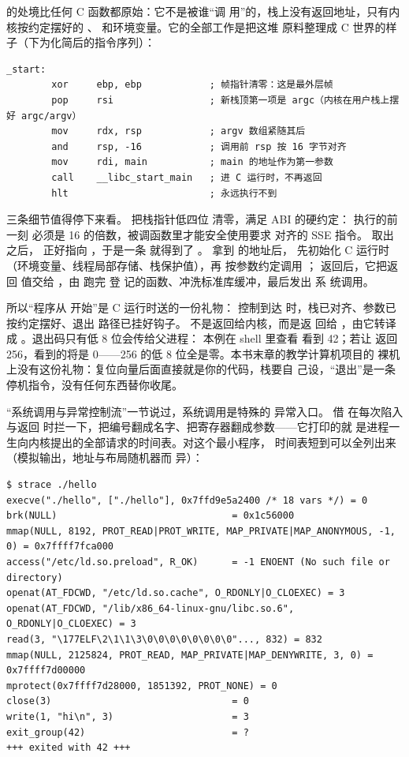  的处境比任何 C 函数都原始：它不是被谁“调
用”的，栈上没有返回地址，只有内核按约定摆好的
、 和环境变量。它的全部工作是把这堆
原料整理成 C 世界的样子（下为化简后的指令序列）：

\begin{lstlisting}
_start:
        xor     ebp, ebp            ; 帧指针清零：这是最外层帧
        pop     rsi                 ; 新栈顶第一项是 argc（内核在用户栈上摆好 argc/argv）
        mov     rdx, rsp            ; argv 数组紧随其后
        and     rsp, -16            ; 调用前 rsp 按 16 字节对齐
        mov     rdi, main           ; main 的地址作为第一参数
        call    __libc_start_main   ; 进 C 运行时，不再返回
        hlt                         ; 永远执行不到
\end{lstlisting}

三条细节值得停下来看。 把栈指针低四位
清零，满足 ABI 的硬约定： 执行的前一刻
 必须是 16 的倍数，被调函数里才能安全使用要求
对齐的 SSE 指令。 取出  之后，
 正好指向 ，于是一条
 就得到了 。
 拿到  的地址后，
先初始化 C 运行时（环境变量、线程局部存储、栈保护值），再
按参数约定调用 ； 返回后，它把返回
值交给 ，由  跑完  登
记的函数、冲洗标准库缓冲，最后发出  系
统调用。

所以“程序从  开始”是 C 运行时送的一份礼物：
控制到达  时，栈已对齐、参数已按约定摆好、退出
路径已挂好钩子。 不是返回给内核，而是返
回给 ，由它转译成
。退出码只有低 8 位会传给父进程：
本例在 shell 里查看  看到 42；若让 
返回 256，看到的将是 0——256 的低 8 位全是零。本书末章的教学计算机项目的
裸机上没有这份礼物：复位向量后面直接就是你的代码，栈要自
己设，“退出”是一条停机指令，没有任何东西替你收尾。

“系统调用与异常控制流”一节说过，系统调用是特殊的
异常入口。 借  在每次陷入与返回
时拦一下，把编号翻成名字、把寄存器翻成参数——它打印的就
是进程一生向内核提出的全部请求的时间表。对这个最小程序，
时间表短到可以全列出来（模拟输出，地址与布局随机器而
异）：

\begin{lstlisting}
$ strace ./hello
execve("./hello", ["./hello"], 0x7ffd9e5a2400 /* 18 vars */) = 0
brk(NULL)                               = 0x1c56000
mmap(NULL, 8192, PROT_READ|PROT_WRITE, MAP_PRIVATE|MAP_ANONYMOUS, -1, 0) = 0x7ffff7fca000
access("/etc/ld.so.preload", R_OK)      = -1 ENOENT (No such file or directory)
openat(AT_FDCWD, "/etc/ld.so.cache", O_RDONLY|O_CLOEXEC) = 3
openat(AT_FDCWD, "/lib/x86_64-linux-gnu/libc.so.6", O_RDONLY|O_CLOEXEC) = 3
read(3, "\177ELF\2\1\1\3\0\0\0\0\0\0\0\0"..., 832) = 832
mmap(NULL, 2125824, PROT_READ, MAP_PRIVATE|MAP_DENYWRITE, 3, 0) = 0x7ffff7d00000
mprotect(0x7ffff7d28000, 1851392, PROT_NONE) = 0
close(3)                                = 0
write(1, "hi\n", 3)                     = 3
exit_group(42)                          = ?
+++ exited with 42 +++
\end{lstlisting}

